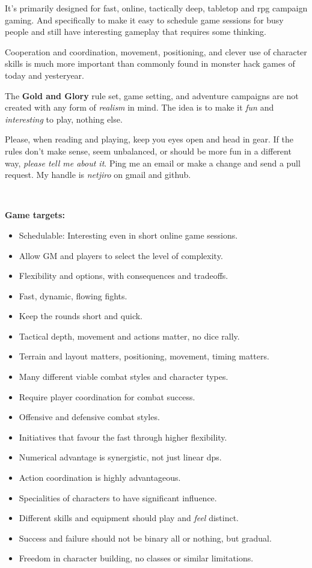 It's primarily designed for fast, online, tactically deep, tabletop and rpg campaign gaming. And specifically to make it easy to schedule game sessions for busy people and still have interesting gameplay that requires some thinking. 

Cooperation and coordination, movement, positioning, and clever use of character skills is much more important than commonly found in monster hack games of today and yesteryear.

The \textbf{Gold and Glory} rule set, game setting, and adventure campaigns are not created with any form of \emph{realism} in mind. The idea is to make it \emph{fun} and \emph{interesting} to play, nothing else.

Please, when reading and playing, keep you eyes open and head in gear. If the rules don't make sense, seem unbalanced, or should be more fun in a different way, \emph{please tell me about it}. Ping me an email or make a change and send a pull request. My handle is \emph{netjiro} on gmail and github.


\

\textbf{Game targets:}
\begin{itemize}
    \item Schedulable: Interesting even in short online game sessions.
    \item Allow GM and players to select the level of complexity.
    \item Flexibility and options, with consequences and tradeoffs.
    \item Fast, dynamic, flowing fights.
    \item Keep the rounds short and quick.
    \item Tactical depth, movement and actions matter, no dice rally.
    \item Terrain and layout matters, positioning, movement, timing matters.
    \item Many different viable combat styles and character types.
    \item Require player coordination for combat success.
    \item Offensive and defensive combat styles.
    \item Initiatives that favour the fast through higher flexibility.
    \item Numerical advantage is synergistic, not just linear dps.
    \item Action coordination is highly advantageous.
    \item Specialities of characters to have significant influence.
    \item Different skills and equipment should play and \emph{feel} distinct.
    \item Success and failure should not be binary all or nothing, but gradual.
    \item Freedom in character building, no classes or similar limitations.
\end{itemize}

